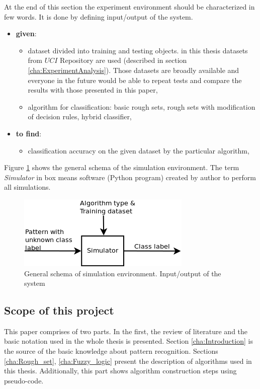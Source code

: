At the end of this section the experiment environment should be characterized in
few words. It is done by defining input/output of the system.
\begin{itemize}
    \item \textbf{given}:
        \begin{itemize}
            \item dataset divided into training and testing objects. in
                this thesis datasets from $UCI$ Repository are used (described in section
                \ref{cha:ExperimentAnalysis}). Those datasets are broadly available and everyone in the
                future would be able to repeat tests and compare the
                results with those presented in this paper,
            \item algorithm for classification: basic rough sets, rough sets
                with modification of decision rules, hybrid classifier,
        \end{itemize}
    \item \textbf{to find}: 
        \begin{itemize}
            \item classification accuracy on the given dataset by the
                particular algorithm,
        \end{itemize}
\end{itemize}
Figure \ref{fig:input_output} shows the general schema of the simulation
environment. The term \textit{Simulator} in box means software (Python program) 
created by author to perform all simulations. 
\begin{figure}[H]
    \begin{center}
        \includegraphics{fig/schema.png}
    \end{center}
    \caption{General schema of simulation environment. Input/output of the
    system}
    \label{fig:input_output}
\end{figure}

\subsection{Scope of this project} 
This paper comprises of two parts. In the first, the review of
literature and the basic notation used in the whole thesis is presented. Section
\ref{cha:Introduction} is the source of the basic
knowledge about pattern recognition. Sections \ref{cha:Rough_set}, \ref{cha:Fuzzy_logic}
present the description of algorithms used in this thesis. Additionally, this
part shows algorithm construction steps using pseudo-code.


